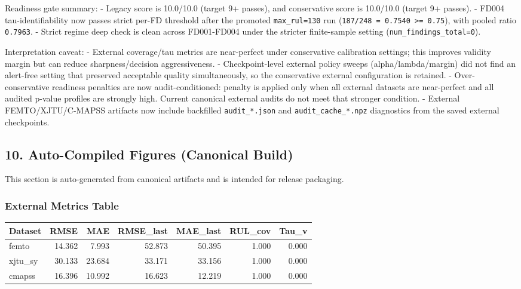 \documentclass[
]{article}
\newcounter{none} %
\begin{document}
Readiness gate summary: - Legacy score is 10.0/10.0 (target 9+ passes),
and conservative score is 10.0/10.0 (target 9+ passes). - FD004
tau-identifiability now passes strict per-FD threshold after the
promoted \texttt{max\_rul=130} run
(\texttt{187/248\ =\ 0.7540\ \textgreater{}=\ 0.75}), with pooled ratio
\texttt{0.7963}. - Strict regime deep check is clean across FD001-FD004
under the stricter finite-sample setting
(\texttt{num\_findings\_total=0}).

Interpretation caveat: - External coverage/tau metrics are near-perfect
under conservative calibration settings; this improves validity margin
but can reduce sharpness/decision aggressiveness. - Checkpoint-level
external policy sweeps (alpha/lambda/margin) did not find an alert-free
setting that preserved acceptable quality simultaneously, so the
conservative external configuration is retained. - Over-conservative
readiness penalties are now audit-conditioned: penalty is applied only
when all external datasets are near-perfect and all audited p-value
profiles are strongly high. Current canonical external audits do not
meet that stronger condition. - External FEMTO/XJTU/C-MAPSS artifacts
now include backfilled \texttt{audit\_*.json} and
\texttt{audit\_cache\_*.npz} diagnostics from the saved external
checkpoints.

\subsection{10. Auto-Compiled Figures (Canonical
Build)}\label{auto-compiled-figures-canonical-build}

This section is auto-generated from canonical artifacts and is intended
for release packaging.

\subsubsection{External Metrics Table}\label{external-metrics-table}

{\def\LTcaptype{none} %
\begin{longtable}[]{@{}lrrrrrr@{}}
\toprule\noalign{}
Dataset & RMSE & MAE & RMSE\_last & MAE\_last & RUL\_cov & Tau\_v \\
\midrule\noalign{}
\endhead
\bottomrule\noalign{}
\endlastfoot
femto & 14.362 & 7.993 & 52.873 & 50.395 & 1.000 & 0.000 \\
xjtu\_sy & 30.133 & 23.684 & 33.171 & 33.156 & 1.000 & 0.000 \\
cmapss & 16.396 & 10.992 & 16.623 & 12.219 & 1.000 & 0.000 \\
\end{longtable}
}
\end{document}
